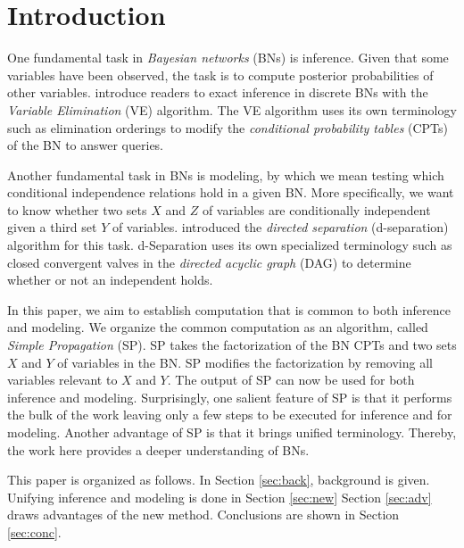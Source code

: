 \section{Introduction}
\label{sec:intro}

One fundamental task in \emph{Bayesian networks} (BNs) \cite{pear88} is inference.
Given that some variables have been observed, the task is to compute posterior probabilities of other variables.
\cite{koll09} introduce readers to exact inference in discrete BNs with the \emph{Variable Elimination} (VE) \cite{zhan94} algorithm.
The VE algorithm uses its own terminology such as elimination orderings to modify the \emph{conditional probability tables} (CPTs) of the BN to answer queries.

Another fundamental task in BNs is modeling, by which we mean testing which conditional independence relations hold in a given BN.
More specifically, we want to know whether two sets $X$ and $Z$ of variables are conditionally independent given a third set $Y$ of variables.
\cite{pearl86,pear88} introduced the \emph{directed separation} (d-separation) algorithm for this task.
d-Separation uses its own specialized terminology such as closed convergent valves in the \emph{directed acyclic graph} (DAG) to determine whether or not an independent holds.

In this paper, we aim to establish computation that is common to both inference and modeling.
We organize the common computation as an algorithm, called \emph{Simple Propagation} (SP).
SP takes the factorization of the BN CPTs and two sets $X$ and $Y$ of variables in the BN.
SP modifies the factorization by removing all variables relevant to $X$ and $Y$.
The output of SP can now be used for both inference and modeling.
Surprisingly, one salient feature of SP is that it performs the bulk of the work leaving only a few steps to be executed for inference and for modeling.
Another advantage of SP is that it brings unified terminology.
Thereby, the work here provides a deeper understanding of BNs.


This paper is organized as follows.
In Section \ref{sec:back}, background is given.
Unifying inference and modeling is done in Section \ref{sec:new}
Section \ref{sec:adv} draws advantages of the new method.
Conclusions are shown in Section \ref{sec:conc}.